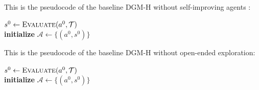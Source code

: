 \documentclass[]{fairmeta}
\begin{document}
This is the pseudocode of the baseline DGM-H without self-improving agents \citep[ADAS,][]{huautomated}:

\begin{algorithm}[H]
\DontPrintSemicolon
\SetAlgoLined
{}
\BlankLine
$s^{0} \leftarrow \textsc{Evaluate}(a^{0}, \mathcal{T})$ \\
\textbf{initialize} $\mathcal{A} \leftarrow \{(a^{0}, s^{0})\}$ \\
\caption{DGM-H without self-improving meta agents (DGM-H w/o self-improve)}
\label{algo:DGM-H-wo-selfimprove}
\end{algorithm}

This is the pseudocode of the baseline DGM-H without open-ended exploration:

\begin{algorithm}[H]
\DontPrintSemicolon
\SetAlgoLined
{}
\BlankLine
$s^{0} \leftarrow \textsc{Evaluate}(a^{0}, \mathcal{T})$ \\
\textbf{initialize} $\mathcal{A} \leftarrow \{(a^{0}, s^{0})\}$ \\
\caption{DGM-H without open-ended exploration (DGM-H w/o open-ended exploration)}
\label{algo:DGM-H-wo-openended}
\end{algorithm}
\end{document}
